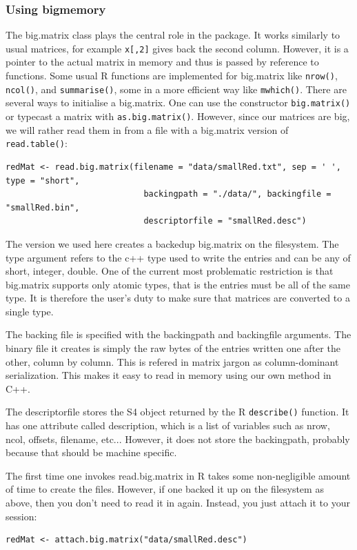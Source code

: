 \documentclass[a4paper,11pt]{amsart}
\begin{document}
\subsubsection{Using bigmemory}
The big.matrix class plays the central role in the package. It works similarly to usual matrices, for example \verb|x[,2]| gives back the second column. However, it is a pointer to the actual matrix in memory and thus is passed by reference to functions. Some usual R functions are implemented for big.matrix like \verb|nrow()|, \verb|ncol()|, and \verb|summarise()|, some in a more efficient way like \verb|mwhich()|. There are several ways to initialise a big.matrix. One can use the constructor \verb|big.matrix()| or typecast a matrix with \verb|as.big.matrix()|. However, since our matrices are big, we will rather read them in from a file with a big.matrix version of \verb|read.table()|: 
\begin{verbatim}
redMat <- read.big.matrix(filename = "data/smallRed.txt", sep = ' ', type = "short",
                            backingpath = "./data/", backingfile = "smallRed.bin",
                            descriptorfile = "smallRed.desc")
\end{verbatim}
The version we used here creates a backedup big.matrix on the filesystem. The type argument refers to the c++ type used to write the entries and can be any of short, integer, double. One of the current most problematic restriction is that big.matrix supports only atomic types, that is the entries must be all of the same type. It is therefore the user's duty to make sure that matrices are converted to a single type. 

The backing file is specified with the backingpath and backingfile arguments. The binary file it creates is simply the raw bytes of the entries written one after the other, column by column. This is refered in matrix jargon as column-dominant serialization. This makes it easy to read in memory using our own method in C++. 

The descriptorfile stores the S4 object returned by the R \verb|describe()| function. It has one attribute called description, which is a list of variables such as nrow, ncol, offsets, filename, etc... However, it does not store the backingpath, probably because that should be machine specific. 

The first time one invokes read.big.matrix in R takes some non-negligible amount of time to create the files. However, if one backed it up on the filesystem as above, then you don't need to read it in again. Instead, you just attach it to your session:
\begin{verbatim}
redMat <- attach.big.matrix("data/smallRed.desc")
\end{verbatim}
\end{document}
